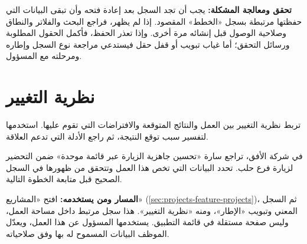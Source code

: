 \textbf{تحقق ومعالجة المشكلة:} يجب أن تجد السجل بعد إعادة فتحه وأن تبقى البيانات التي حفظتها مرتبطة بسجل «الخطط» المقصود. إذا لم يظهر، فراجع البحث والفلاتر والنطاق وصلاحية الوصول قبل إنشائه مرة أخرى. وإذا تعذر الحفظ، فأكمل الحقول المطلوبة ورسائل التحقق؛ أما غياب تبويب أو قفل حقل فيستدعي مراجعة نوع السجل وإطاره ومرحلته مع المسؤول.

\clearpage
\section{نظرية التغيير}
\label{sec:projects-feature-theory-of-change}

تربط نظرية التغيير بين العمل والنتائج المتوقعة والافتراضات التي تقوم عليها. استخدمها لتفسير سبب توقع النتيجة، ثم راجع الأدلة التي تدعم العلاقة.

\begin{rcnote}
في شركة الأفق، تراجع سارة «تحسين جاهزية الزيارة عبر قائمة موحدة» ضمن التحضير لزيارة فرع حلب. تحدد البيانات التي تخص هذا العمل وتتحقق من ظهورها في السجل الصحيح قبل متابعة الخطوة التالية.
\end{rcnote}

\textbf{المسار ومن يستخدمه:} افتح «المشاريع» (\ref{sec:projects-feature-projects})، ثم السجل المعني وتبويب «الإطار»، ومنه «نظرية التغيير». هذا سجل مرتبط داخل مساحة العمل، وليس صفحة مستقلة في قائمة التطبيق. يستخدمها المسؤول عن هذا العمل، ويعدّل الموظف البيانات المسموح له بها وفق صلاحياته.

